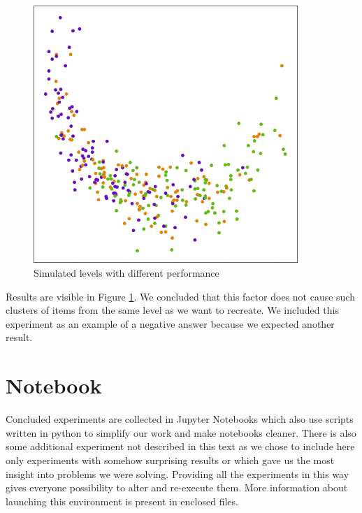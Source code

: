 \documentclass[
  digital, %
  table,   %
  nolof,     %
  nolot,     %
  nocover,
  color,
  final, %
]{fithesis3}
\begin{document}
\begin{figure}
  \includegraphics[width=10cm]{img/simulated_performance}
  \caption{Simulated levels with different performance}
  \label{fig:simulated_performance}
\end{figure}


Results are visible in Figure \ref{fig:simulated_performance}. We concluded that this factor does not cause such clusters of items from the same level as we want to recreate. We included this experiment as an example of a negative answer because we expected another result.


\section{Notebook}\label{notebook}

Concluded experiments are collected in Jupyter Notebooks which also use scripts written in python to simplify our work and make notebooks cleaner. There is also some additional experiment not described in this text as we chose to include here only experiments with somehow surprising results or which gave us the most insight into problems we were solving. Providing all the experiments in this way gives everyone possibility to alter and re-execute them. More information about launching this environment is present in enclosed files.

\end{document}
